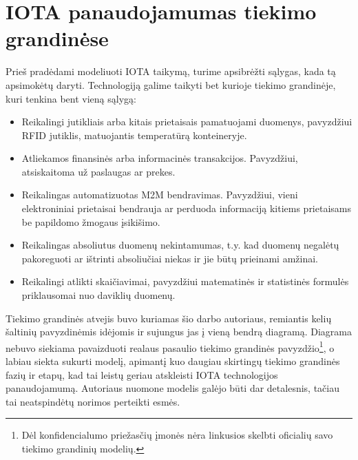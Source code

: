 
\section{IOTA panaudojamumas tiekimo grandinėse}

Prieš pradėdami modeliuoti IOTA taikymą, turime apsibrėžti sąlygas, kada tą apsimokėtų daryti. Technologiją galime taikyti bet kurioje tiekimo grandinėje, kuri tenkina bent vieną sąlygą:
\begin{itemize}
    \item Reikalingi jutikliais arba kitais prietaisais pamatuojami duomenys, pavyzdžiui RFID jutiklis, matuojantis temperatūrą konteineryje.
    \item Atliekamos finansinės arba informacinės transakcijos. Pavyzdžiui, atsiskaitoma už paslaugas ar prekes.
    \item Reikalingas automatizuotas M2M bendravimas. Pavyzdžiui, vieni elektroniniai prietaisai bendrauja ar perduoda informaciją kitiems prietaisams be papildomo žmogaus įsikišimo.
    \item Reikalingas absoliutus duomenų nekintamumas, t.y. kad duomenų negalėtų pakoreguoti ar ištrinti absoliučiai niekas ir jie būtų prieinami amžinai.
    \item Reikalingi atlikti skaičiavimai, pavyzdžiui matematinės ir statistinės formulės priklausomai nuo daviklių duomenų.
\end{itemize}

Tiekimo grandinės atvejis buvo kuriamas šio darbo autoriaus, remiantis kelių šaltinių pavyzdinėmis idėjomis \cite{christopher2016logistics} \cite{webber2009building} \cite{patrick2017continuous} \cite{justin2016customer} ir sujungus jas į vieną bendrą diagramą. Diagrama nebuvo siekiama pavaizduoti realaus pasaulio tiekimo grandinės pavyzdžio\footnote{Dėl konfidencialumo priežasčių įmonės nėra linkusios skelbti oficialių savo tiekimo grandinių modelių.}, o labiau siekta sukurti modelį, apimantį kuo daugiau skirtingų tiekimo grandinės fazių ir etapų, kad tai leistų geriau atskleisti IOTA technologijos panaudojamumą. Autoriaus nuomone modelis galėjo būti dar detalesnis, tačiau tai neatspindėtų norimos perteikti esmės.




